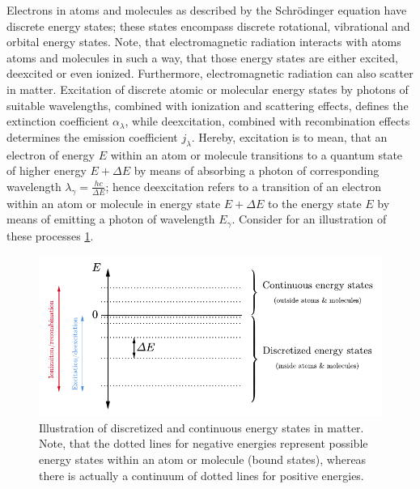 \documentclass[a4paper,12pt]{report}
\begin{document}
Electrons in atoms and molecules as described by the Schrödinger equation have discrete energy states; these states encompass discrete rotational, vibrational and orbital energy states. Note, that electromagnetic radiation interacts with atoms atoms and molecules in such a way, that those energy states are either excited, deexcited or even ionized. Furthermore, electromagnetic radiation can also scatter in matter. Excitation of discrete atomic or molecular energy states by photons of suitable wavelengths, combined with ionization and scattering effects, defines the extinction coefficient $\alpha_\lambda$, while deexcitation, combined with recombination effects determines the emission coefficient $j_\lambda$. Hereby, excitation is to mean, that an electron of energy $E$ within an atom or molecule transitions to a quantum state of higher energy $E + \Delta E$ by means of absorbing a photon of corresponding wavelength $\lambda_{\gamma} = \tfrac{hc}{\Delta E}$; hence deexcitation refers to a transition of an electron within an atom or molecule in energy state $E + \Delta E$ to the energy state $E$ by means of emitting a photon of wavelength $E_\gamma$. Consider for an illustration of these processes \cref{fig:energylevels}.
\begin{figure}[h]
\centering
\includegraphics[width=12cm]{figures/energystates.pdf}
\caption{Illustration of discretized and continuous energy states in matter. Note, that the dotted lines for negative energies represent possible energy states within an atom or molecule (bound states), whereas there is actually a continuum of dotted lines for positive energies.}
\label{fig:energylevels}
\end{figure}
\end{document}
